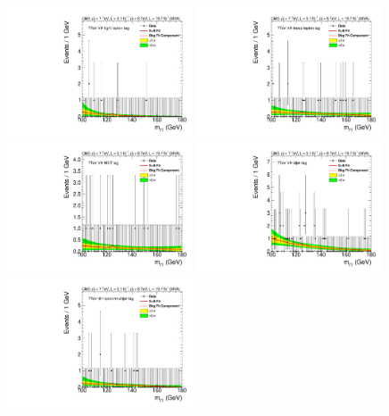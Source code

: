 \begin{figure}
  \vspace{-1cm}
  \includegraphics[width=0.49\textwidth]{results/plots/mgg-cats/mgg_mva_nosub_ch1_cat6_7TeV.pdf}
  \includegraphics[width=0.49\textwidth]{results/plots/mgg-cats/mgg_mva_nosub_ch1_cat7_7TeV.pdf}
  \includegraphics[width=0.49\textwidth]{results/plots/mgg-cats/mgg_mva_nosub_ch1_cat8_7TeV.pdf}
  \includegraphics[width=0.49\textwidth]{results/plots/mgg-cats/mgg_mva_nosub_ch1_cat10_7TeV.pdf}
  \includegraphics[width=0.49\textwidth]{results/plots/mgg-cats/mgg_mva_nosub_ch1_cat9_7TeV.pdf}

\end{figure}
